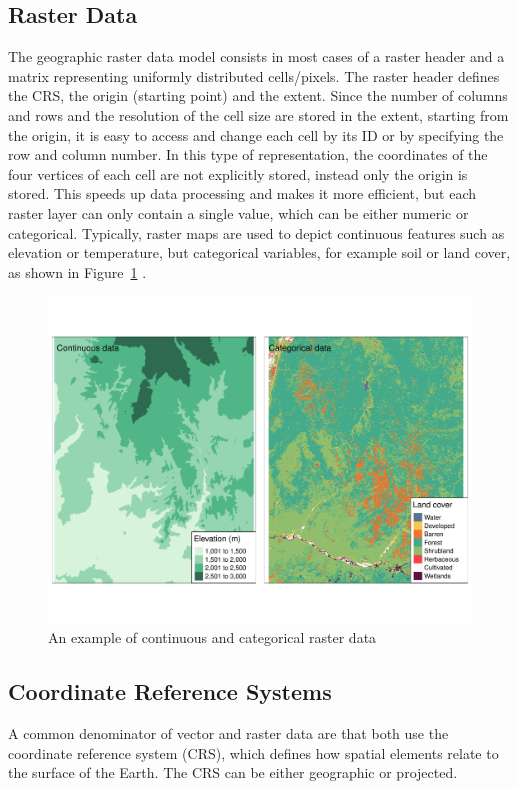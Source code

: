 \subsection{Raster Data}
The geographic raster data model consists in most cases of a raster header and a matrix representing uniformly distributed cells/pixels. The raster header defines the CRS, the origin (starting point) and the extent. Since the number of columns and rows and the resolution of the cell size are stored in the extent, starting from the origin, it is easy to access and change each cell by its ID or by specifying the row and column number. In this type of representation, the coordinates of the four vertices of each cell are not explicitly stored, instead only the origin is stored. This speeds up data processing and makes it more efficient, but each raster layer can only contain a single value, which can be either numeric or categorical. Typically, raster maps are used to depict continuous features such as elevation or temperature, but categorical variables, for example soil or land cover, as shown in Figure~\ref{fig:raster} \autocite[][]{lovelace2019geocomputation}.
\begin{figure}[H]
   \centering
       \includegraphics[page=1,width=\textwidth]{raster.pdf}
 \caption{An example of continuous and categorical raster data}
 \label{fig:raster}
\end{figure}
\subsection*{Coordinate Reference Systems}
A common denominator of vector and raster data are that both use the coordinate reference system (CRS), which defines how spatial elements relate to the surface of the Earth. The CRS can be either geographic or projected.
